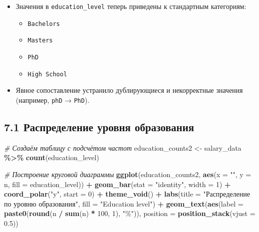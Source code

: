 \documentclass[
]{article}
\newenvironment{Shaded}{\begin{snugshade}}{\end{snugshade}}
\newcommand{\AttributeTok}[1]{\textcolor[rgb]{0.13,0.29,0.53}{#1}}
\newcommand{\CommentTok}[1]{\textcolor[rgb]{0.56,0.35,0.01}{\textit{#1}}}
\newcommand{\DecValTok}[1]{\textcolor[rgb]{0.00,0.00,0.81}{#1}}
\newcommand{\FloatTok}[1]{\textcolor[rgb]{0.00,0.00,0.81}{#1}}
\newcommand{\FunctionTok}[1]{\textcolor[rgb]{0.13,0.29,0.53}{\textbf{#1}}}
\newcommand{\NormalTok}[1]{#1}
\newcommand{\OtherTok}[1]{\textcolor[rgb]{0.56,0.35,0.01}{#1}}
\newcommand{\SpecialCharTok}[1]{\textcolor[rgb]{0.81,0.36,0.00}{\textbf{#1}}}
\newcommand{\StringTok}[1]{\textcolor[rgb]{0.31,0.60,0.02}{#1}}
\providecommand{\tightlist}{%
  \setlength{\itemsep}{0pt}\setlength{\parskip}{0pt}}
\begin{document}
\begin{itemize}
\tightlist
\item
  Значения в \texttt{education\_level} теперь приведены к стандартным
  категориям:

  \begin{itemize}
  \tightlist
  \item
    \texttt{Bachelor\textquotesingle{}s}
  \item
    \texttt{Master\textquotesingle{}s}
  \item
    \texttt{PhD}
  \item
    \texttt{High\ School}
  \end{itemize}
\item
  Явное сопоставление устранило дублирующиеся и некорректные значения
  (например, \texttt{phD} → \texttt{PhD}).
\end{itemize}

\subsection{7.1 Распределение уровня
образования}\label{ux440ux430ux441ux43fux440ux435ux434ux435ux43bux435ux43dux438ux435-ux443ux440ux43eux432ux43dux44f-ux43eux431ux440ux430ux437ux43eux432ux430ux43dux438ux44f}

\begin{Shaded}
\begin{Highlighting}[]
\CommentTok{\# Создаём таблицу с подсчётом частот}
\NormalTok{education\_counts2 }\OtherTok{\textless{}{-}}\NormalTok{ salary\_data }\SpecialCharTok{\%\textgreater{}\%}
  \FunctionTok{count}\NormalTok{(education\_level)}

\CommentTok{\# Построение круговой диаграммы}
\FunctionTok{ggplot}\NormalTok{(education\_counts2, }\FunctionTok{aes}\NormalTok{(}\AttributeTok{x =} \StringTok{""}\NormalTok{, }\AttributeTok{y =}\NormalTok{ n, }\AttributeTok{fill =}\NormalTok{ education\_level)) }\SpecialCharTok{+}
  \FunctionTok{geom\_bar}\NormalTok{(}\AttributeTok{stat =} \StringTok{"identity"}\NormalTok{, }\AttributeTok{width =} \DecValTok{1}\NormalTok{) }\SpecialCharTok{+}
  \FunctionTok{coord\_polar}\NormalTok{(}\StringTok{"y"}\NormalTok{, }\AttributeTok{start =} \DecValTok{0}\NormalTok{) }\SpecialCharTok{+}
  \FunctionTok{theme\_void}\NormalTok{() }\SpecialCharTok{+}
  \FunctionTok{labs}\NormalTok{(}\AttributeTok{title =} \StringTok{"Распределение по уровню образования"}\NormalTok{, }\AttributeTok{fill =} \StringTok{"Education level"}\NormalTok{) }\SpecialCharTok{+}
  \FunctionTok{geom\_text}\NormalTok{(}\FunctionTok{aes}\NormalTok{(}\AttributeTok{label =} \FunctionTok{paste0}\NormalTok{(}\FunctionTok{round}\NormalTok{(n }\SpecialCharTok{/} \FunctionTok{sum}\NormalTok{(n) }\SpecialCharTok{*} \DecValTok{100}\NormalTok{, }\DecValTok{1}\NormalTok{), }\StringTok{"\%"}\NormalTok{)), }
            \AttributeTok{position =} \FunctionTok{position\_stack}\NormalTok{(}\AttributeTok{vjust =} \FloatTok{0.5}\NormalTok{))}
\end{Highlighting}
\end{Shaded}
\end{document}
